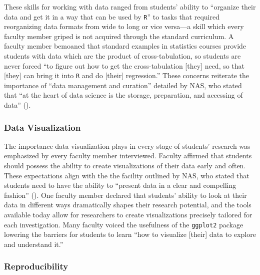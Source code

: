 \documentclass[12pt]{article}
\begin{document}
\quad These skills for working with data ranged from students' ability to 
``organize their data and get it in a way that can be used by \texttt{R}'' to 
tasks that required reorganizing data formats from wide to long or vice 
versa---a skill which every faculty member griped is not acquired through the
standard curriculum. A faculty member bemoaned that standard examples in
statistics courses provide students with data which are the product
of cross-tabulation, so students are never forced ``to figure out how to get the
cross-tabulation [they] need, so that [they] can bring it into \texttt{R} and do
[their] regression.'' These concerns reiterate the importance of ``data
management and curation'' detailed by NAS, who stated that ``at the heart of
data science is the storage, preparation, and accessing of data'' 
(\citeyear[p.\ 26]{nas}). 

\subsubsection{Data Visualization} 

\quad The importance data visualization plays in every stage of students'
research was emphasized by every faculty member interviewed. Faculty affirmed
that students should possess the ability to create visualizations of their data
early and often. These expectations align with the the facility outlined by NAS,
who stated that students need to have the ability to ``present
data in a clear and compelling fashion'' (\citeyear[p.\ 26]{nas}). One faculty member declared
that students' ability to look at their data in different ways dramatically
shapes their research potential, and the tools available today allow for
researchers to create visualizations precisely tailored for each investigation.
Many faculty voiced the usefulness of the \texttt{ggplot2} package \citep{ggplot} 
lowering the barriers for students to learn ``how to visualize [their] data to
explore and understand it.'' 

\subsubsection{Reproducibility}  
\end{document}
